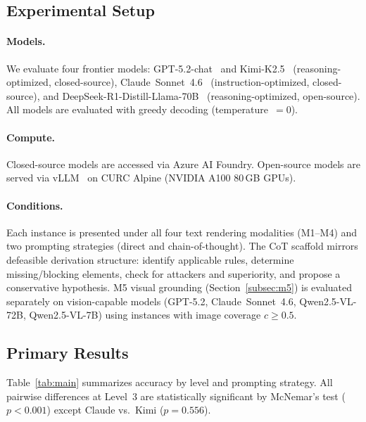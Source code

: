 \documentclass{article}
\theoremstyle{definition}
\begin{document}
\subsection{Experimental Setup}\label{subsec:setup}

\paragraph{Models.}
We evaluate four frontier models: GPT-5.2-chat~\cite{openai2025gpt52} and Kimi-K2.5~\cite{moonshot2025kimi} (reasoning-optimized, closed-source), Claude~Sonnet~4.6~\cite{anthropic2024claude} (instruction-optimized, closed-source), and DeepSeek-R1-Distill-Llama-70B~\cite{deepseek2025r1} (reasoning-optimized, open-source). All models are evaluated with greedy decoding (temperature~$= 0$).

\paragraph{Compute.}
Closed-source models are accessed via Azure AI Foundry. Open-source models are served via vLLM~\cite{kwon2023vllm} on CURC Alpine (NVIDIA A100 80\,GB GPUs).

\paragraph{Conditions.}
Each instance is presented under all four text rendering modalities (M1--M4) and two prompting strategies (direct and chain-of-thought). The CoT scaffold mirrors defeasible derivation structure: identify applicable rules, determine missing/blocking elements, check for attackers and superiority, and propose a conservative hypothesis. M5 visual grounding (Section~\ref{subsec:m5}) is evaluated separately on vision-capable models (GPT-5.2, Claude~Sonnet~4.6, Qwen2.5-VL-72B, Qwen2.5-VL-7B) using instances with image coverage $c \geq 0.5$.


\subsection{Primary Results}\label{subsec:results}

Table~\ref{tab:main} summarizes accuracy by level and prompting strategy. All pairwise differences at Level~3 are statistically significant by McNemar's test ($p < 0.001$) except Claude vs.\ Kimi ($p = 0.556$).
\end{document}
